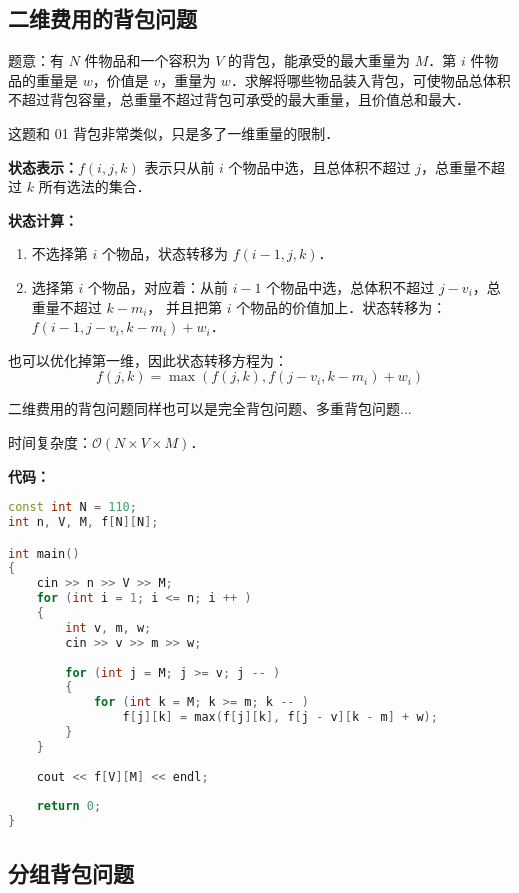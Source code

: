 \subsection{二维费用的背包问题}

题意：有 $N$ 件物品和一个容积为 $V$ 的背包，能承受的最大重量为 $M$．第 $i$ 件物品的重量是 $w$，价值是 $v$，重量为 $w$．求解将哪些物品装入背包，可使物品总体积不超过背包容量，总重量不超过背包可承受的最大重量，且价值总和最大．

这题和 01 背包非常类似，只是多了一维重量的限制．

\textbf{状态表示：$f(i, j, k)$} 表示只从前 $i$ 个物品中选，且总体积不超过 $j$，总重量不超过 $k$ 所有选法的集合．

\textbf{状态计算：}

\begin{enumerate}
\item 不选择第 $i$ 个物品，状态转移为 $f(i - 1, j, k)$．
\item 选择第 $i$ 个物品，对应着：从前 $i - 1$ 个物品中选，总体积不超过 $j - v_i$，总重量不超过 $k - m_i$， 并且把第 $i$ 个物品的价值加上．状态转移为：$f(i - 1, j - v_i, k - m_i) + w_i$．
\end{enumerate}

也可以优化掉第一维，因此状态转移方程为：
\begin{equation}
f(j, k) = \max(f(j, k), f(j - v_i, k - m_i) + w_i)
\end{equation}

二维费用的背包问题同样也可以是完全背包问题、多重背包问题...

时间复杂度：$\mathcal{O}(N \times V \times M)$．

\textbf{代码：}

\begin{lstlisting}[language=cpp]
const int N = 110;
int n, V, M, f[N][N];

int main()
{
    cin >> n >> V >> M;
    for (int i = 1; i <= n; i ++ )
    {
        int v, m, w;
        cin >> v >> m >> w;
        
        for (int j = M; j >= v; j -- )
        {
            for (int k = M; k >= m; k -- )
                f[j][k] = max(f[j][k], f[j - v][k - m] + w);
        }
    }
    
    cout << f[V][M] << endl;
    
    return 0;
}
\end{lstlisting}

\subsection{分组背包问题}

